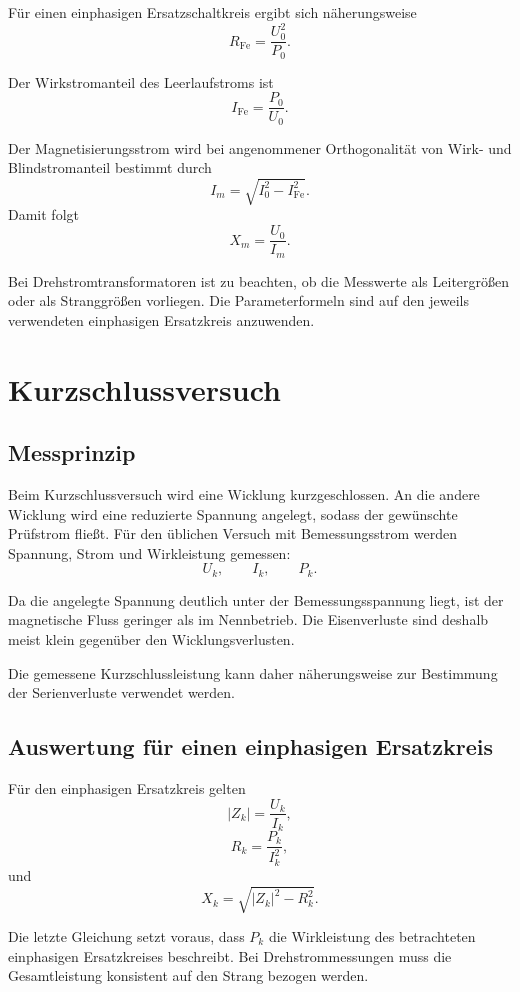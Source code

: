 Für einen einphasigen Ersatzschaltkreis ergibt sich näherungsweise
\[
  R_{\mathrm{Fe}}=\frac{U_0^2}{P_0}.
\]

Der Wirkstromanteil des Leerlaufstroms ist
\[
  I_{\mathrm{Fe}}=\frac{P_0}{U_0}.
\]

Der Magnetisierungsstrom wird bei angenommener Orthogonalität von Wirk- und
Blindstromanteil bestimmt durch
\[
  I_m=\sqrt{I_0^2-I_{\mathrm{Fe}}^2}.
\]
Damit folgt
\[
  X_m=\frac{U_0}{I_m}.
\]

Bei Drehstromtransformatoren ist zu beachten, ob die Messwerte als
Leitergrößen oder als Stranggrößen vorliegen. Die Parameterformeln sind
auf den jeweils verwendeten einphasigen Ersatzkreis anzuwenden.

\section{Kurzschlussversuch}

\subsection{Messprinzip}

Beim Kurzschlussversuch wird eine Wicklung kurzgeschlossen. An die andere
Wicklung wird eine reduzierte Spannung angelegt, sodass der gewünschte
Prüfstrom fließt. Für den üblichen Versuch mit Bemessungsstrom werden
Spannung, Strom und Wirkleistung gemessen:
\[
  U_k,\qquad I_k,\qquad P_k.
\]

Da die angelegte Spannung deutlich unter der Bemessungsspannung liegt,
ist der magnetische Fluss geringer als im Nennbetrieb. Die Eisenverluste
sind deshalb meist klein gegenüber den Wicklungsverlusten.

Die gemessene Kurzschlussleistung kann daher näherungsweise zur Bestimmung
der Serienverluste verwendet werden.

\subsection{Auswertung für einen einphasigen Ersatzkreis}

Für den einphasigen Ersatzkreis gelten
\[
  |Z_k|=\frac{U_k}{I_k},
\]
\[
  R_k=\frac{P_k}{I_k^2},
\]
und
\[
  X_k=\sqrt{|Z_k|^2-R_k^2}.
\]

Die letzte Gleichung setzt voraus, dass \(P_k\) die Wirkleistung des
betrachteten einphasigen Ersatzkreises beschreibt. Bei Drehstrommessungen
muss die Gesamtleistung konsistent auf den Strang bezogen werden.

